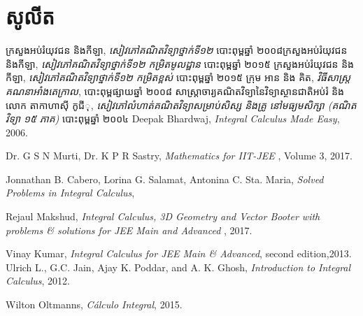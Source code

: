 \chapter{សូលីត}



\backmatter
\begin{thebibliography}{3}
	​ក្រសួងអប់រំយុវជន និងកីឡា, \emph{ សៀវភៅគណិតវិទ្យាថ្នាក់ទី១២ } បោះពុម្ពឆ្នាំ ២០០៨
	​ក្រសួងអប់រំយុវជន និងកីឡា, \emph{ សៀវភៅគណិតវិទ្យាថ្នាក់ទី១២ កម្រិតមូលដ្ឋាន} បោះពុម្ពឆ្នាំ ២០១៥
	ក្រសួងអប់រំយុវជន និងកីឡា, \emph{ សៀវភៅគណិតវិទ្យាថ្នាក់ទី១២ កម្រិតខ្ពស់} បោះពុម្ពឆ្នាំ ២០១៥
	 ក្រុម អាន និង គិត, \emph{វិធីសាស្ត្រគណនាអាំងតេក្រាល}, បោះពុម្ពផ្សាយឆ្នាំ ២០០៨
	សាស្ត្រាចារ្យគណិតវិទ្យានៃវិទ្យាស្ថានជាតិអប់រំ និង លោក តាកាហាស៊ី កូជីុ, \emph{ សៀវភៅលំហាត់គណិតវិទ្យាសម្រាប់សិស្ស និងគ្រូ នៅមធ្យមសិក្សា (គណិតវិទ្យា ១៥ ភាគ)} 
	បោះពុម្ពឆ្នាំ ២០០៤
	 Deepak Bhardwaj, \emph{ Integral Calculus Made Easy}, 2006.
	
	 Dr. G S N Murti, Dr. K P R Sastry, \emph{Mathematics for IIT-JEE} , Volume 3,  2017.
	
	 Jonnathan B. Cabero, Lorina G. Salamat, Antonina C. Sta. Maria, 
	\emph{Solved Problems in Integral Calculus},
	
	 Rejaul Makshud, \emph{Integral Calculus, 3D Geometry and Vector Booter with problems \& solutions for JEE Main and Advanced} , 2017.
	
	 Vinay Kumar,\emph{ Integral Calculus for JEE Main \& Advanced}, second edition,2013.
	 Ulrich L., G.C. Jain, Ajay K. Poddar, and A. K. Ghosh, 
	\emph{Introduction to Integral Calculus}, 2012.
	
	 Wilton Oltmanns, \emph{C\'{a}lculo Integral},  2015.
\end{thebibliography}

	

